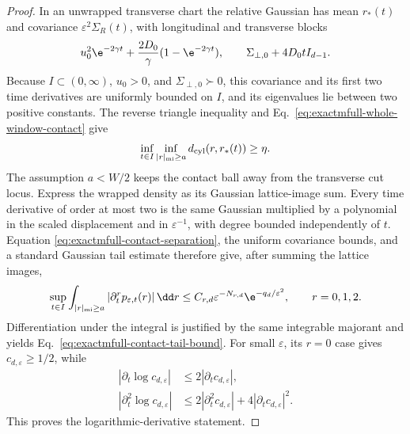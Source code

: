 \begin{proof}
In an unwrapped transverse chart the relative Gaussian has mean \(r_*(t)\)
and covariance \(\varepsilon^2\Sigma_R(t)\), with longitudinal and transverse
blocks
\begin{align}
 u_0^2\e^{-2\gamma t}
 +\frac{2D_0}{\gamma}(1-\e^{-2\gamma t}),
 \qquad
 \Sigma_{\perp,0}+4D_0t I_{d-1}.
 \label{eq:exactmfull-relative-covariance}
\end{align}
Because \(I\subset(0,\infty)\), \(u_0>0\), and
\(\Sigma_{\perp,0}\succ0\), this covariance and its first two time
derivatives are uniformly bounded on \(I\), and its eigenvalues lie between
two positive constants.  The reverse triangle inequality and
Eq.~\eqref{eq:exactmfull-whole-window-contact} give
\begin{equation}
 \inf_{t\in I}\inf_{|r|_{\rm mi}\ge a}
 d_{\rm cyl}(r,r_*(t))\ge\eta.
 \label{eq:exactmfull-contact-separation}
\end{equation}
The assumption \(a<W/2\) keeps the contact ball away from the transverse cut
locus.  Express the wrapped density as its Gaussian lattice-image sum.
Every time derivative of order at most two is the same Gaussian multiplied
by a polynomial in the scaled displacement and in \(\varepsilon^{-1}\),
with degree bounded independently of \(t\).  Equation
\eqref{eq:exactmfull-contact-separation}, the uniform covariance bounds, and
a standard Gaussian tail estimate therefore give, after summing the lattice
images,
\begin{equation}
 \sup_{t\in I}\int_{|r|_{\rm mi}\ge a}
 |\partial_t^r p_{\varepsilon,t}(r)|\,\dd r
 \le C_{r,d}\varepsilon^{-N_{r,d}}
       \e^{-q_d/\varepsilon^2},
 \qquad r=0,1,2.
 \label{eq:exactmfull-density-tail}
\end{equation}
Differentiation under the integral is justified by the same integrable
majorant and yields Eq.~\eqref{eq:exactmfull-contact-tail-bound}.  For small
\(\varepsilon\), its \(r=0\) case gives \(c_{d,\varepsilon}\ge1/2\), while
\begin{align}
 |\partial_t\log c_{d,\varepsilon}|
 &\le2|\partial_t c_{d,\varepsilon}|,\nonumber\\
 |\partial_t^2\log c_{d,\varepsilon}|
 &\le2|\partial_t^2c_{d,\varepsilon}|
      +4|\partial_tc_{d,\varepsilon}|^2.
 \label{eq:exactmfull-log-contact-bounds}
\end{align}
This proves the logarithmic-derivative statement.
\end{proof}

